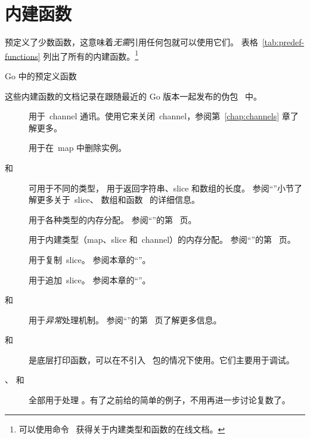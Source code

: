 \section{内建函数}
预定义了少数函数，这意味着\emph{无需}引用任何包就可以使用它们。
表格~\ref{tab:predef-functions} 列出了所有的内建函数。\footnote{可以使用命令~
 获得关于内建类型和函数的在线文档。}

\begin{table}[H]
\begin{center}
\caption{Go 中的预定义函数}
\label{tab:predef-functions}

\end{center}
\end{table}

这些内建函数的文档记录在跟随最近的 Go 版本一起发布的伪包~  中。

\begin{description}
\item[] 用于~channel
通讯。使用它来关闭~channel，参阅第~\ref{chap:channels} 章了解更多。

\item[] 用于在~map 中删除实例。

\item[ 和~] 可用于不同的类型，
 用于返回字符串、slice 和数组的长度。
参阅``''小节了解更多关于~slice、
数组和函数~ 的详细信息。

\item[] 用于各种类型的内存分配。
参阅``''的第~\pageref{sec:allocation with new} 页。

\item[] 用于内建类型（map、slice 和~channel）的内存分配。
参阅``''的第~\pageref{sec:allocation with make} 页。

\item[] 用于复制~slice。
参阅本章的``''。

\item[] 用于追加~slice。
参阅本章的``''。

\item[ 和~] 用于\emph{异常}处理机制。
参阅``''的第~\pageref{sec:panic} 页了解更多信息。

\item[ 和~] 是底层打印函数，可以在不引入~
 包的情况下使用。它们主要用于调试。

\item[、 和~] 全部用于处理
。有了之前给的简单的例子，不用再进一步讨论复数了。
\end{description}

